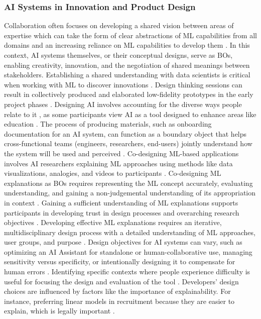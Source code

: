 \documentclass[12pt,oneside]{article}
\begin{document}
\subsubsection{AI Systems in Innovation and Product Design} \label{ai-systems-in-innovation-and-product-design}

Collaboration often focuses on developing a shared vision between areas of expertise which can take the form of clear abstractions of \ac{ML} capabilities from all domains and an increasing reliance on \ac{ML} capabilities to develop them \citep[1]{yang2018investigating}. In this context, \ac{AI} systems themselves, or their conceptual designs, serve as \ac{BO}s, enabling creativity, innovation, and the negotiation of shared meanings between stakeholders. Establishing a shared understanding with data scientists is critical when working with \ac{ML} to discover innovations \citep[8]{yang2018investigating}. \newline
Design thinking sessions can result in collectively produced and elaborated low-fidelity prototypes in the early project phases \citep[76]{särner2024prospective}. Designing \ac{AI} involves accounting for the diverse ways people relate to it \citep[418]{veletsianos2024artificial}, as some participants view \ac{AI} as a tool designed to enhance areas like education \citep[418]{veletsianos2024artificial}. The process of producing materials, such as onboarding documentation for an \ac{AI} system, can function as a boundary object that helps cross-functional teams (engineers, researchers, end-users) jointly understand how the system will be used and perceived \citep[10]{cai2021onboarding}. Co-designing \ac{ML}-based applications involves \ac{AI} researchers explaining \ac{ML} approaches using methods like data visualizations, analogies, and videos to participants \citep[3]{ayobi2021machine}. \newline
Co-designing \ac{ML} explanations as \ac{BO}s requires representing the \ac{ML} concept accurately, evaluating understanding, and gaining a non-judgemental understanding of its appropriation in context \citep[6-7]{ayobi2021machine}. Gaining a sufficient understanding of \ac{ML} explanations supports participants in developing trust in design processes and overarching research objectives \citep[7]{ayobi2021machine}. Developing effective \ac{ML} explanations requires an iterative, multidisciplinary design process with a detailed understanding of \ac{ML} approaches, user groups, and purpose \citep[7]{ayobi2021machine}. Design objectives for \ac{AI} systems can vary, such as optimizing an \ac{AI} Assistant for standalone or human-collaborative use, managing sensitivity versus specificity, or intentionally designing it to compensate for human errors \citep[3]{cai2021onboarding}. Identifying specific contexts where people experience difficulty is useful for focusing the design and evaluation of the tool \citep[6]{cai2021onboarding}. Developers' design choices are influenced by factors like the importance of explainability. For instance, preferring linear models in recruitment because they are easier to explain, which is legally important \citep[6141]{mayer2023managing}. \newline
\end{document}
